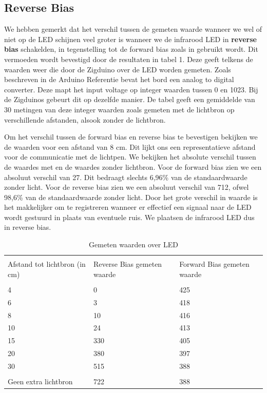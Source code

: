 \documentclass{article}
\begin{document}
\subsection{Reverse Bias}
We hebben gemerkt dat het verschil tussen de gemeten waarde wanneer we wel of niet op de LED schijnen veel groter is wanneer we de infrarood LED in \textbf{reverse bias} schakelden, in tegenstelling tot de forward bias zoals in \cite{smartLED} gebruikt wordt. Dit vermoeden wordt bevestigd door de resultaten in tabel 1. Deze geeft telkens de waarden weer die door de Zigduino over de LED worden gemeten. Zoals beschreven in de Arduino Referentie \cite{Arduino} bevat het bord een analog to digital converter. Deze mapt het input voltage op integer waarden tussen 0 en 1023. Bij de Zigduinos gebeurt dit op dezelfde manier. De tabel geeft een gemiddelde van 30 metingen van deze integer waarden zoals gemeten met de lichtbron op verschillende afstanden, alsook zonder de lichtbron. 

Om het verschil tussen de forward bias en reverse bias te bevestigen bekijken we de waarden voor een afstand van 8 cm. Dit lijkt ons een representatieve afstand voor de communicatie met de lichtpen. We bekijken het absolute verschil tussen de waardes met en de waardes zonder lichtbron. 
Voor de forward bias zien we een absoluut verschil van 27. Dit bedraagt slechts 6,96\% van de standaardwaarde zonder licht. 
Voor de reverse bias zien we een absoluut verschil van 712, ofwel 98,6\% van de standaardwaarde zonder licht. 
Door het grote verschil in waarde is het makkelijker om te registreren wanneer er effectief een signaal naar de LED wordt gestuurd in plaats van eventuele ruis. We plaatsen de infrarood LED dus in reverse bias.


\begin{table}
	\centering
    \begin{tabular}{ | p{1.5cm} | p{1.5 cm} | p{1.5 cm} | }
    \hline
    & & \\
    Afstand tot lichtbron (in cm) & Reverse Bias gemeten waarde & Forward Bias gemeten waarde  \\ \hline
    & &  \\
    4 & 0 & 425  \\ 
    6 & 3 & 418   \\ 
    8 & 10 & 416   \\ 
    10 & 24 & 413   \\ 
    15 & 330 & 405   \\ 
    20 & 380 & 397  \\ 
    30 & 515 & 388  \\ \hline
    & & \\ 
    Geen extra lichtbron & 722 & 388   \\ 

    \hline
    \end{tabular}
  \caption{Gemeten waarden over LED} 
\end{table}
\end{document}
